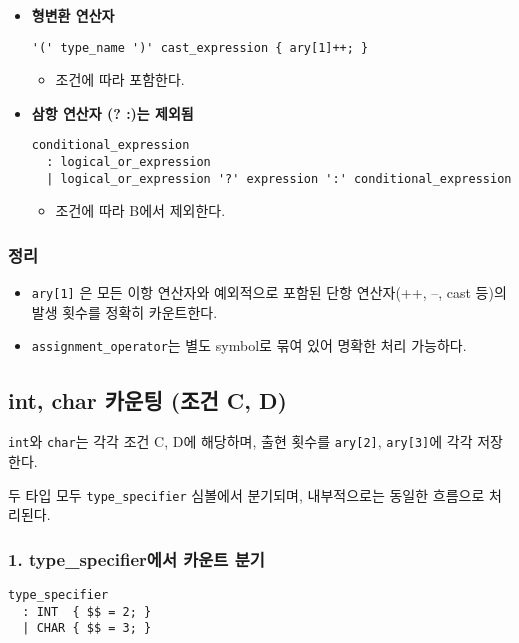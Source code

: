 \documentclass{article}
\begin{document}
\begin{itemize}
  \item \textbf{형변환 연산자}
  \begin{lstlisting}
'(' type_name ')' cast_expression { ary[1]++; }
  \end{lstlisting}
  \begin{itemize}
    \item 조건에 따라 포함한다.
  \end{itemize}

  \item \textbf{삼항 연산자 (? :)는 제외됨}
  \begin{lstlisting}
conditional_expression
  : logical_or_expression
  | logical_or_expression '?' expression ':' conditional_expression
  \end{lstlisting}
  \begin{itemize}
    \item 조건에 따라 B에서 제외한다.
  \end{itemize}
\end{itemize}

\subsubsection*{정리}

\begin{itemize}
  \item \texttt{ary[1]} 은 모든 이항 연산자와 예외적으로 포함된 단항 연산자(++, --, cast 등)의 발생 횟수를 정확히 카운트한다.
  \item \texttt{assignment\_operator}는 별도 symbol로 묶여 있어 명확한 처리 가능하다.
\end{itemize}

\subsection{int, char 카운팅 (조건 C, D)}

\texttt{int}와 \texttt{char}는 각각 조건 C, D에 해당하며, 출현 횟수를 \texttt{ary[2]}, \texttt{ary[3]}에 각각 저장한다. 

두 타입 모두 \texttt{type\_specifier} 심볼에서 분기되며, 내부적으로는 동일한 흐름으로 처리된다.

\subsubsection*{1. type\_specifier에서 카운트 분기}

\begin{lstlisting}
type_specifier
  : INT  { $$ = 2; }
  | CHAR { $$ = 3; }
\end{lstlisting}
\end{document}
